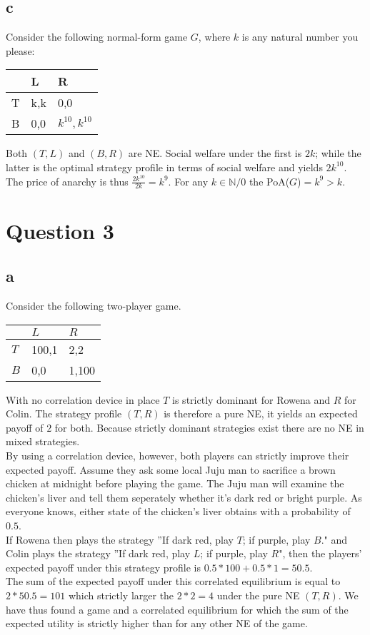 \documentclass[10pt,a4paper]{article}
\begin{document}
\subsection*{c}
Consider the following normal-form game $G$, where $k$ is any natural number you please:
\begin{table}[h]
\begin{tabular}{|l|l|l|}
\hline
  & L   & R               \\ \hline
T & k,k & 0,0             \\ \hline
B & 0,0 & $k^{10},k^{10}$ \\ \hline
\end{tabular}
\end{table}
Both $(T,L)$ and $(B,R)$ are NE. Social welfare under the first is $2k$; while the latter is the optimal strategy profile in terms of social welfare and yields $2k^{10}$. The price of anarchy is thus $\tfrac{2k^{10}}{2k}=k^{9}$. For any $k\in \mathbb{N}/{0}$ the PoA($G$)$=k^{9}>k$.
\section*{Question 3}
\subsection*{a}
Consider the following two-player game.
\begin{table}[h]
\begin{tabular}{|l|l|l|}
\hline
          & $L$ & $R$  \\ \hline
$T$     & 100,1   & 2,2 \\ \hline
$B$     & 0,0 & 1,100  \\ \hline
\end{tabular}
\end{table}
With no correlation device in place $T$ is strictly dominant for Rowena and $R$ for Colin. The strategy profile $(T,R)$ is therefore a pure NE, it yields an expected payoff of $2$ for both. Because strictly dominant strategies exist there are no NE in mixed strategies.\\
By using a correlation device, however, both players can strictly improve their expected payoff. Assume they ask some local Juju man to sacrifice a brown chicken at midnight before playing the game. The Juju man will examine the chicken's liver and tell them seperately whether it's dark red or bright purple. As everyone knows, either state of the chicken's liver obtains with a probability of $0.5$.\\ If Rowena then plays the strategy ''If dark red, play $T$; if purple, play $B$." and Colin plays the strategy ''If dark red, play $L$; if purple, play $R$", then the players' expected payoff under this strategy profile is $0.5*100+0.5*1=50.5$.\\
The sum of the expected payoff under this correlated equilibrium is equal to $2*50.5=101$ which strictly larger the $2*2=4$ under the pure NE $(T,R)$. We have thus found a game and a correlated equilibrium for which the sum of the expected utility is strictly higher than for any other NE of the game.
\end{document}
